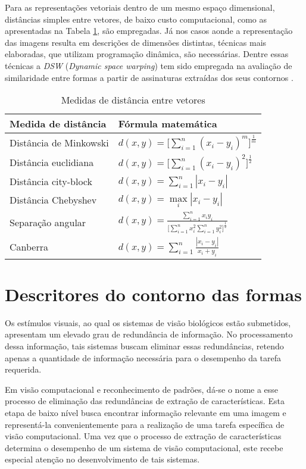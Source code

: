 Para as representações vetoriais dentro de um mesmo espaço dimensional, distâncias simples entre vetores, de baixo custo computacional, como as apresentadas na Tabela \ref{tbl:distance}, são empregadas. Já nos casos aonde a representação das imagens resulta em descrições de dimensões distintas, técnicas mais elaboradas, que utilizam programação dinâmica, são necessárias. Dentre essas técnicas a \emph{DSW} (\emph{Dynamic space warping}) tem sido empregada na avaliação de similaridade entre formas a partir de assinaturas extraídas dos seus contornos \cite{Alajlan20117}. 

\begin{table}
\centering
\caption{\label{tbl:distance}Medidas de distância entre vetores}
\begin{tabular}[]{ll}
\hline
Medida de distância&Fórmula matemática\\
\hline
Distância de Minkowski&$d(x,y) = \Big[\sum\limits_{i=1}^{n}(x_i-y_i)^m\Big]^\frac{1}{m}$\\
Distância euclidiana&$d(x,y) = \Big[\sum\limits_{i=1}^{n}(x_i-y_i)^2\Big]^\frac{1}{2}$\\
Distância city-block&$d(x,y)= \sum\limits_{i=1}^{n}|x_i-y_i|$\\
Distância Chebyshev&$d(x,y)= \max\limits_{i}|x_i-y_i|$\\
Separação angular&$d(x,y)=\frac{\sum\limits_{i=1}^n{x_iy_i}}{\Big[\sum\limits_{i=1}^n{x_i^2}\sum\limits_{i=1}^n{y_i^2}\Big]^\frac{1}{2}}$\\
Canberra&$d(x,y) = \sum\limits_{i=1}^n\frac{|x_i-y_i|}{x_i+y_i}$\\
\hline
\end{tabular}
\end{table}

\section{\label{chap:contour}Descritores do contorno das formas}

Os estímulos visuais, ao qual os sistemas de visão biológicos estão submetidos, apresentam um elevado grau de redundância de informação. No processamento dessa informação, tais sistemas buscam eliminar essas redundâncias, retendo apenas a quantidade de informação necessária para o desempenho da tarefa requerida.  

Em visão computacional e reconhecimento de padrões, dá-se o nome a esse processo de eliminação das redundâncias de extração de características. Esta etapa de baixo nível busca encontrar informação relevante em uma imagem e representá-la convenientemente para a realização de uma tarefa específica de visão computacional. Uma vez que o processo de extração de características determina o desempenho de um sistema de visão computacional, este recebe especial atenção no desenvolvimento de tais sistemas.

